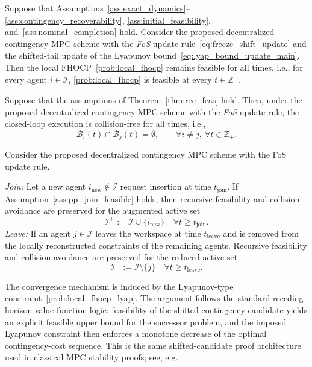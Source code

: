 \documentclass[twocolumn]{autart}
\begin{document}
\begin{theorem}
\label{thm:rec_feas}
Suppose that Assumptions~\ref{ass:exact_dynamics}--\ref{ass:contingency_recoverability}, \ref{ass:initial_feasibility}, and~\ref{ass:nominal_completion} hold.
Consider the proposed decentralized contingency MPC scheme with the \textit{FoS} update rule~\eqref{eq:freeze_shift_update} and the shifted-tail update of the Lyapunov bound~\eqref{eq:lyap_bound_update_main}.
Then the local FHOCP~\eqref{prob:local_fhocp} remains feasible for all times, i.e., for every agent $i\in\mathcal I$, \eqref{prob:local_fhocp} is feasible at every  $t\in\mathbb Z_+$.
\end{theorem}

\begin{theorem}
\label{thm:safety}
Suppose that the assumptions of Theorem~\ref{thm:rec_feas} hold.
Then, under the proposed decentralized contingency MPC scheme with the \textit{FoS} update rule, the closed-loop execution is collision-free for all times, i.e.,
\[
\mathcal B_i(t)\cap \mathcal B_j(t)=\emptyset,
\qquad \forall i\neq j,\ \forall t\in\mathbb Z_+.
\]
\end{theorem}

\begin{corollary}
\label{cor:pnp_preservation}
Consider the proposed decentralized contingency MPC scheme with the FoS update rule.

\emph{Join:}
Let a new agent $i_{\mathrm{new}}\notin\mathcal I$ request insertion at time $t_{\mathrm{join}}$.
If Assumption~\ref{ass:pp_join_feasible} holds, then recursive feasibility and collision avoidance are preserved for the augmented active set
\[
\mathcal I^+ := \mathcal I \cup \{i_{\mathrm{new}}\} \quad \forall t\ge t_{\mathrm{join}}.
\]
\emph{Leave:}
If an agent $j\in\mathcal I$ leaves the workspace at time $t_{\mathrm{leave}}$ and is removed from the locally reconstructed constraints of the remaining agents. Recursive feasibility and collision avoidance are preserved for the reduced active set
\[
\mathcal I^- := \mathcal I \setminus \{j\} \quad \forall t \geq t_{\mathrm{leave}}.
\]
\end{corollary}
The convergence mechanism is induced by the Lyapunov-type constraint~\eqref{prob:local_fhocp_lyap}.
The argument follows the standard receding-horizon value-function logic: feasibility of the shifted contingency candidate yields an explicit feasible upper bound for the successor problem, and the imposed Lyapunov constraint then enforces a monotone decrease of the optimal contingency-cost sequence. This is the same shifted-candidate proof architecture used in classical MPC stability proofs; see, e.g.,~\cite{ChenAllgoewer1998,Mayne2000}.
\end{document}
